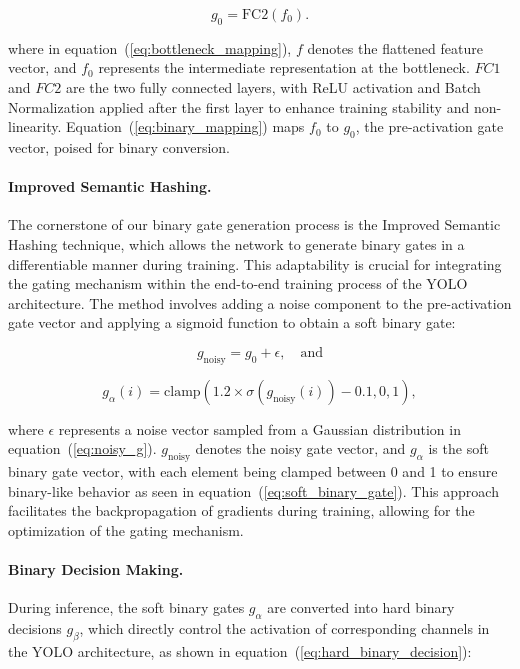 \begin{equation}
g_0 = \text{FC2}(f_0).
\label{eq:binary_mapping}
\end{equation}

\noindent{}where in equation~(\ref{eq:bottleneck_mapping}), \(f\) denotes the flattened feature vector, and \(f_0\) represents the intermediate representation at the bottleneck. \(FC1\) and \(FC2\) are the two fully connected layers, with ReLU activation and Batch Normalization applied after the first layer to enhance training stability and non-linearity. Equation~(\ref{eq:binary_mapping}) maps \(f_0\) to \(g_0\), the pre-activation gate vector, poised for binary conversion.

\paragraph{Improved Semantic Hashing.} The cornerstone of our binary gate generation process is the Improved Semantic Hashing technique, which allows the network to generate binary gates in a differentiable manner during training. This adaptability is crucial for integrating the gating mechanism within the end-to-end training process of the YOLO architecture. The method involves adding a noise component to the pre-activation gate vector and applying a sigmoid function to obtain a soft binary gate:

\begin{equation}
g_{\text{noisy}} = g_0 + \epsilon, \quad \text{and}
\label{eq:noisy_g}
\end{equation}

\begin{equation}
g_{\alpha}(i) = \text{clamp}(1.2 \times \sigma(g_{\text{noisy}}(i)) - 0.1, 0, 1),
\label{eq:soft_binary_gate}
\end{equation}

\noindent{}where \(\epsilon\) represents a noise vector sampled from a Gaussian distribution in equation~(\ref{eq:noisy_g}). \(g_{\text{noisy}}\) denotes the noisy gate vector, and \(g_{\alpha}\) is the soft binary gate vector, with each element being clamped between 0 and 1 to ensure binary-like behavior as seen in equation~(\ref{eq:soft_binary_gate}). This approach facilitates the backpropagation of gradients during training, allowing for the optimization of the gating mechanism.

\paragraph{Binary Decision Making.} During inference, the soft binary gates \(g_{\alpha}\) are converted into hard binary decisions \(g_{\beta}\), which directly control the activation of corresponding channels in the YOLO architecture, as shown in equation~(\ref{eq:hard_binary_decision}):

